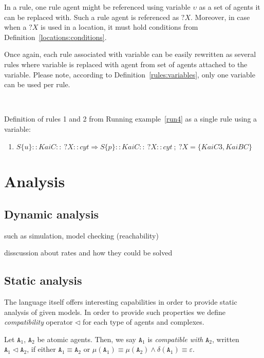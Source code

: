 \documentclass[12pt]{fithesis2}
\begin{document}
In a rule, one rule agent might be referenced using variable $\upsilon$ as a set of agents it can be replaced with. Such a rule agent is referenced as $?X$. Moreover, in case when a $?X$ is used in a location, it must hold conditions from Definition~\ref{locations:conditions}.

Once again, each rule associated with variable can be easily rewritten as several rules where variable is replaced with agent from set of agents attached to the variable. Please note, according to Definition~\ref{rules:variables}, only one variable can be used per rule.

\begin{runningExample}\label{run5}
$ $

\noindent Definition of rules 1 and 2 from Running example~\ref{run4} as a single rule using a variable:
\begin{enumerate}
\item $S\{u\}::KaiC::~?X::cyt \Rightarrow S\{p\}::KaiC::~?X::cyt ~;~ ?X = \{KaiC3, KaiBC\} $
\end{enumerate}
\end{runningExample}



\chapter{Analysis}

\section{Dynamic analysis}

such as simulation, model checking (reachability)

disscussion about rates and how they could be solved

\section{Static analysis}

The language itself offers interesting capabilities in order to provide static analysis of given models. In order to provide such properties we define \emph{compatibility} operator $\lhd$ for each type of agents and complexes.

\begin{definition}
Let $\mathtt{A}_1$, $\mathtt{A}_2$ be atomic agents. Then, we say $\mathtt{A}_1$ is \emph{compatible with} $\mathtt{A}_2$, written $\mathtt{A}_1 \lhd \mathtt{A}_2$, if either $\mathtt{A}_1 \equiv \mathtt{A}_2$ or $\mu(\mathtt{A}_1) \equiv \mu(\mathtt{A}_2) \wedge \delta(\mathtt{A}_1) \equiv \varepsilon $.
\end{definition}
\end{document}
